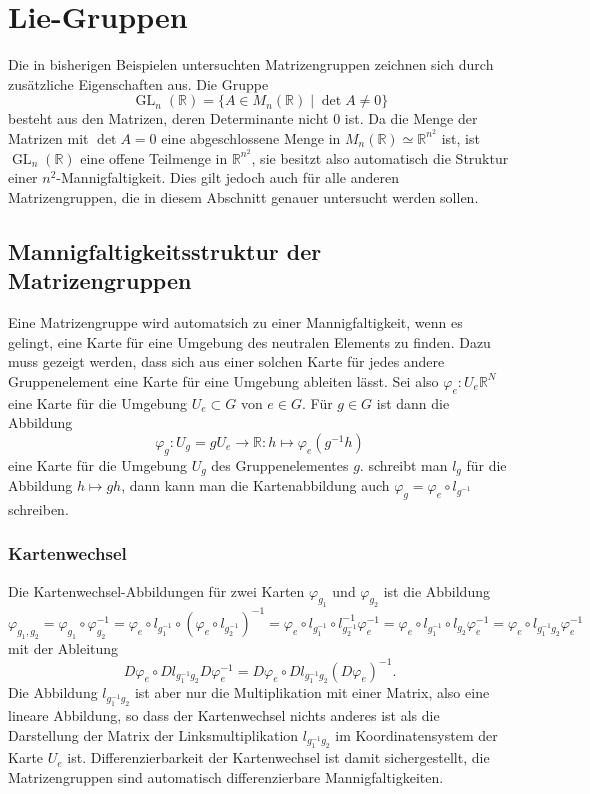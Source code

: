 %
%
%
\section{Lie-Gruppen
\label{buch:section:lie-gruppen}}
Die in bisherigen Beispielen untersuchten Matrizengruppen zeichnen sich
durch zusätzliche Eigenschaften aus.
Die Gruppe
\[
\operatorname{GL}_n(\mathbb{R}) 
=
\{ A \in M_n(\mathbb{R})\;|\; \det A \ne 0\}
\]
besteht aus den Matrizen, deren Determinante nicht $0$ ist.
Da die Menge der Matrizen mit $\det A=0$ eine abgeschlossene Menge
in $M_n(\mathbb{R}) \simeq \mathbb{R}^{n^2}$ ist, ist
$\operatorname{GL}_n(\mathbb{R})$ eine offene Teilmenge in $\mathbb{R}^{n^2}$,
sie besitzt also automatisch die Struktur einer $n^2$-Mannigfaltigkeit.
Dies gilt jedoch auch für alle anderen Matrizengruppen, die in diesem
Abschnitt genauer untersucht werden sollen.

\subsection{Mannigfaltigkeitsstruktur der Matrizengruppen
\label{buch:subsection:mannigfaltigkeitsstruktur-der-matrizengruppen}}
Eine Matrizengruppe wird automatsich zu einer Mannigfaltigkeit,
wenn es gelingt, eine Karte für eine Umgebung des neutralen Elements
zu finden.
Dazu muss gezeigt werden, dass sich aus einer solchen Karte für jedes
andere Gruppenelement eine Karte für eine Umgebung ableiten lässt.
Sei also $\varphi_e\colon U_e\mathbb{R}^N$ eine Karte für die Umgebung
$U_e\subset G$ von $e\in G$.
Für $g\in G$ ist dann die Abbildung
\[
\varphi_g
\colon
U_g
=
gU_e
\to
\mathbb{R}
:
h\mapsto \varphi_e(g^{-1}h)
\]
eine Karte für die Umgebung $U_g$ des Gruppenelementes $g$.
schreibt man $l_{g}$ für  die Abbildung $h\mapsto gh$, dann
kann man die Kartenabbildung auch $\varphi_g = \varphi_e\circ l_{g^{-1}}$
schreiben.

\subsubsection{Kartenwechsel}
Die Kartenwechsel-Abbildungen für zwei Karten $\varphi_{g_1}$
und $\varphi_{g_2}$ ist die Abbildung
\[
\varphi_{g_1,g_2}
=
\varphi_{g_1}\circ \varphi_{g_2}^{-1}
=
\varphi_e\circ l_{g_1^{-1}} \circ (\varphi_e\circ l_{g_2^{-1}})^{-1}
=
\varphi_e\circ l_{g_1^{-1}} \circ l_{g_2^{-1}}^{-1} \varphi_e^{-1}
=
\varphi_e\circ l_{g_1^{-1}} \circ l_{g_2}\varphi_e^{-1}
=
\varphi_e\circ l_{g_1^{-1}g_2}\varphi_e^{-1}
\]
mit der Ableitung
\[
D\varphi_e\circ Dl_{g_1^{-1}g_2} D\varphi_e^{-1}
=
D\varphi_e\circ Dl_{g_1^{-1}g_2} (D\varphi_e)^{-1}.
\]
Die Abbildung $l_{g_1^{-1}g_2}$ ist aber nur die Multiplikation mit
einer Matrix, also eine lineare Abbildung, so dass der Kartenwechsel
nichts anderes ist als die Darstellung der Matrix der Linksmultiplikation
$l_{g_1^{-1}g_2}$ im Koordinatensystem der Karte $U_e$ ist.
Differenzierbarkeit der Kartenwechsel ist damit sichergestellt,
die Matrizengruppen sind automatisch differenzierbare Mannigfaltigkeiten.

